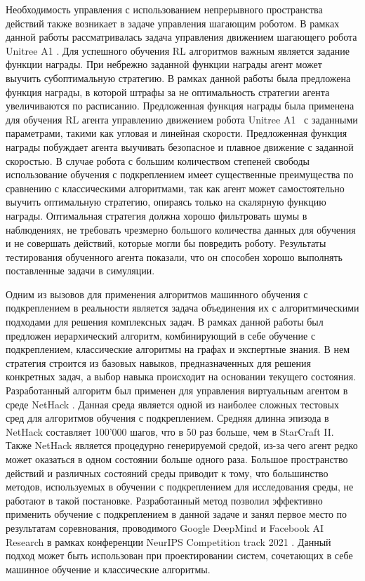 Необходимость управления с использованием непрерывного пространства действий также возникает в задаче управления шагающим роботом. В рамках данной работы рассматривалась задача управления движением шагающего робота Unitree A1 \cite{rl_unitree}. Для успешного обучения RL алгоритмов важным является задание функции награды. При небрежно заданной функции награды агент может выучить субоптимальную стратегию. В рамках данной работы была предложена функция награды, в которой штрафы за не оптимальность стратегии агента увеличиваются по расписанию. Предложенная функция награды была применена для обучения RL агента управлению движением робота Unitree A1~\cite{unitree} с заданными параметрами, такими как угловая и линейная скорости. Предложенная функция награды побуждает агента выучивать безопасное и плавное движение с заданной скоростью. В случае робота с большим количеством степеней свободы использование обучения с подкреплением имеет существенные преимущества по сравнению с классическими алгоритмами, так как агент может самостоятельно выучить оптимальную стратегию, опираясь только на скалярную функцию награды. Оптимальная стратегия должна хорошо фильтровать шумы в наблюдениях, не требовать чрезмерно большого количества данных для обучения и не совершать действий, которые могли бы повредить роботу. Результаты тестирования обученного агента показали, что он способен хорошо выполнять поставленные задачи в симуляции.

Одним из вызовов для применения алгоритмов машинного обучения с подкреплением в реальности является задача объединения их с алгоритмическими подходами для решения комплексных задач. В рамках данной работы был предложен иерархический алгоритм, комбинирующий в себе обучение с подкреплением, классические алгоритмы на графах и экспертные знания. В нем стратегия строится из базовых навыков, предназначенных для решения конкретных задач, а выбор навыка происходит на основании текущего состояния. Разработанный алгоритм был применен для управления виртуальным агентом в среде NetHack \cite{nethack}. Данная среда является одной из наиболее сложных тестовых сред для алгоритмов обучения с подкреплением. Средняя длинна эпизода в NetHack составляет 100'000 шагов, что в 50 раз больше, чем в StarCraft II. Также NetHack является процедурно генерируемой средой, из-за чего агент редко может оказаться в одном состоянии больше одного раза. Большое пространство действий и различных состояний среды приводит к тому, что большинство методов, используемых в обучении с подкреплением для исследования среды, не работают в такой постановке. Разработанный метод позволил эффективно применить обучение с подкреплением в данной задаче и занял первое место по результатам соревнования, проводимого Google DeepMind и Facebook AI Research в рамках конференции NeurIPS Competition track 2021 \cite{raph}. Данный подход может быть использован при проектировании систем, сочетающих в себе машинное обучение и классические алгоритмы. 



